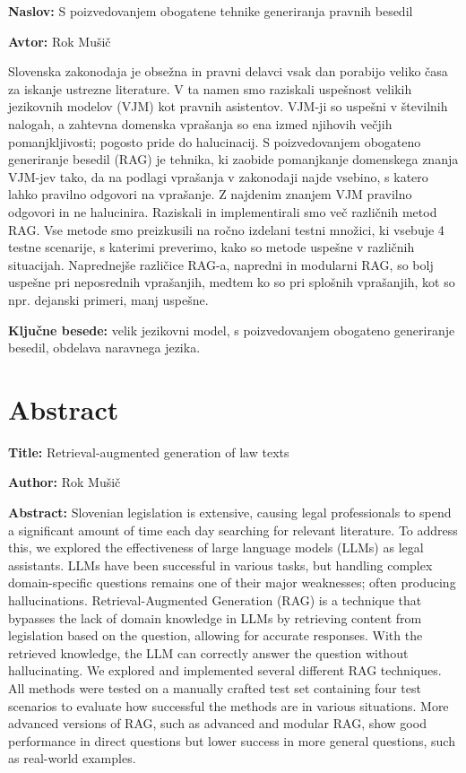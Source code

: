 \documentclass[a4paper,12pt,openright]{book}
\newcommand{\ttitle}{S poizvedovanjem obogatene tehnike generiranja pravnih besedil}
\newcommand{\ttitleEn}{Retrieval-augmented generation of law texts}
\newcommand{\tauthor}{Rok Mušič}
\newcommand{\tkeywords}{velik jezikovni model, s poizvedovanjem obogateno generiranje besedil, obdelava naravnega jezika}
\newcommand{\clearemptydoublepage}{\newpage{\pagestyle{empty}\cleardoublepage}}
\begin{document}
\noindent\textbf{Naslov:} \ttitle
\bigskip

\noindent\textbf{Avtor:} \tauthor
\bigskip

\noindent Slovenska zakonodaja je obsežna in pravni delavci vsak dan porabijo veliko časa za iskanje ustrezne literature. V ta namen smo raziskali uspešnost velikih jezikovnih modelov (VJM) kot pravnih asistentov. VJM-ji so uspešni v številnih nalogah, a zahtevna domenska vprašanja so ena izmed njihovih večjih pomanjkljivosti; pogosto pride do halucinacij. S poizvedovanjem obogateno generiranje besedil (RAG) je tehnika, ki zaobide pomanjkanje domenskega znanja VJM-jev tako, da na podlagi vprašanja v zakonodaji najde vsebino, s katero lahko pravilno odgovori na vprašanje. Z najdenim znanjem VJM pravilno odgovori in ne halucinira. Raziskali in implementirali smo več različnih metod RAG. Vse metode smo preizkusili na ročno izdelani testni množici, ki vsebuje 4 testne scenarije, s katerimi preverimo, kako so metode uspešne v različnih situacijah. Naprednejše različice RAG-a, napredni in modularni RAG, so bolj uspešne pri neposrednih vprašanjih, medtem ko so pri splošnih vprašanjih, kot so npr. dejanski primeri, manj uspešne.

\bigskip

\noindent\textbf{Ključne besede:} \tkeywords.
\clearemptydoublepage


{}
\chapter*{Abstract}

\noindent\textbf{Title:} \ttitleEn
\bigskip

\noindent\textbf{Author:} \tauthor
\bigskip

\noindent\textbf{Abstract:}
\noindent Slovenian legislation is extensive, causing legal professionals to spend a significant amount of time each day searching for relevant literature. To address this, we explored the effectiveness of large language models (LLMs) as legal assistants. LLMs have been successful in various tasks, but handling complex domain-specific questions remains one of their major weaknesses; often producing hallucinations. Retrieval-Augmented Generation (RAG) is a technique that bypasses the lack of domain knowledge in LLMs by retrieving content from legislation based on the question, allowing for accurate responses. With the retrieved knowledge, the LLM can correctly answer the question without hallucinating. We explored and implemented several different RAG techniques. All methods were tested on a manually crafted test set containing four test scenarios to evaluate how successful the methods are in various situations. More advanced versions of RAG, such as advanced and modular RAG, show good performance in direct questions but lower success in more general questions, such as real-world examples.
\bigskip
\end{document}
